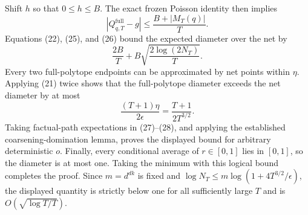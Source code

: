 Shift \(h\) so that \(0\leq h\leq B\).  The exact frozen Poisson identity then implies
\[
 \left|Q^{\mathrm{full}}_{q,T}-g\right|
 \leq\frac{B+|M_T(q)|}{T}.
 \tag{26}
\]
Equations (22), (25), and (26) bound the expected diameter over the net by
\[
 \frac{2B}{T}+B\sqrt{\frac{2\log(2N_T)}T}.
 \tag{27}
\]
Every two full-polytope endpoints can be approximated by net points within \(\eta\).  Applying (21) twice shows that the full-polytope diameter exceeds the net diameter by at most
\[
 \frac{(T+1)\eta}{2\epsilon}=\frac{T+1}{2T^{3/2}}.
 \tag{28}
\]
Taking factual-path expectations in (27)--(28), and applying the established coarsening-domination lemma, proves the displayed bound for arbitrary deterministic \(o\).  Finally, every conditional average of \(r\in[0,1]\) lies in \([0,1]\), so the diameter is at most one.  Taking the minimum with this logical bound completes the proof.  Since \(m=d^{dk}\) is fixed and \(\log N_T\leq m\log(1+4T^{3/2}/\epsilon)\), the displayed quantity is strictly below one for all sufficiently large \(T\) and is \(O(\sqrt{\log T/T})\).
